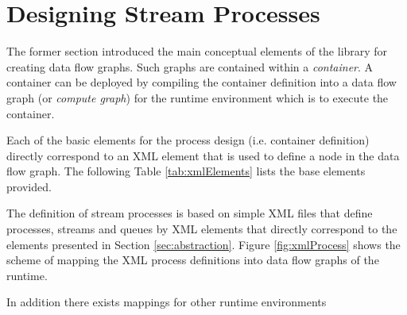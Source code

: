 \newpage
\section{\label{sec:processDesign}Designing Stream Processes}
The former section introduced the main conceptual elements of the
\streams library for creating data flow graphs. Such graphs are
contained within a {\em container}.  A container can be deployed by
compiling the container definition into a data flow graph (or {\em
  compute graph}) for the runtime environment which is to execute the
container.

Each of the basic elements for the process design (i.e. container
definition) directly correspond to an XML element that is used to
define a node in the data flow graph. The following Table
\ref{tab:xmlElements} lists the base elements provided.

\begin{table}[h!]
  \caption{\label{tab:xmlElements}The basic XML element used to define a compute graph within the \streams framework.}
\end{table}



The definition of stream processes is based on simple XML files that
define processes, streams and queues by XML elements that directly
correspond to the elements presented in Section
\ref{sec:abstraction}. Figure \ref{fig:xmlProcess} shows the scheme of
mapping the XML process definitions into data flow graphs of the
\streams runtime.



In addition there exists mappings for other runtime environments






%